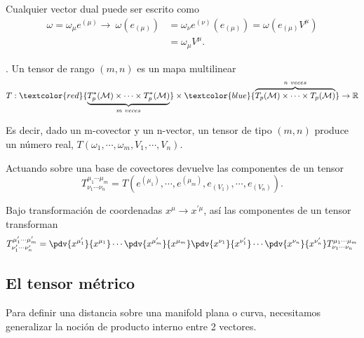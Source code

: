 \documentclass[../main]{subfiles}
\begin{document}
\begin{adjustwidth}{0pt}{-100pt}
Cualquier vector dual puede ser escrito como 
\begin{equation}
    \begin{split}
        \omega=\omega_{\mu}e^{(\mu)} \rightarrow \ \omega(e_{(\mu)})&=\omega_{\nu}e^{(\nu)}(e_{(\mu)})=\omega(e_{(\mu)}V^{\mu})\\
        &=\omega_{\mu}V^{\mu}.
    \end{split}
\end{equation}

. Un tensor de rango $(m, n)$ es un mapa multilinear
\begin{equation}
    T: \textcolor{red}{\underbrace{T^*_p(\mathcal{M})\times \cdots \times T^*_p(\mathcal{M})}_{m \ veces}} \times \textcolor{blue}{\overbrace{T_p(\mathcal{M})\times \cdots \times T_p(\mathcal{M})}^{n \ veces}} \rightarrow \mathbb{R}
\end{equation}

Es decir, dado un m-covector y un n-vector, un tensor de tipo $(m, n)$ produce un número real, $T(\omega_1, \cdots, \omega_m, V_1, \cdots, V_n)$.

Actuando sobre una base de covectores devuelve las componentes de un tensor
\begin{equation}
    T^{\mu_1 \cdots \mu_m}_{\nu_1 \cdots \nu_n}=T(e^{(\mu_1)}, \cdots, e^{(\mu_m)}, e_{(V_1)}, \cdots, e_{(V_n)}).
\end{equation}

Bajo transformación de coordenadas $x^{\mu} \rightarrow x^{'\mu}$, así las componentes de un tensor transforman 
\begin{equation}
    T^{\mu'_1 \cdots \mu'_m}_{\nu'_1 \cdots \nu'_n}=\pdv{x^{\mu'_1}}{x^{\mu_1}}\cdots \pdv{x^{\mu'_m}}{x^{\mu_m}}\pdv{x^{\nu_1}}{x^{\nu'_1}}\cdots \pdv{x^{\nu_n}}{x^{\nu'_n}}T^{\mu_1 \cdots \mu_m}_{\nu_1 \cdots \nu_n}
\end{equation}

\subsection{El tensor métrico}
Para definir una distancia sobre una manifold plana o curva, necesitamos generalizar la noción de producto interno entre 2 vectores.


\end{adjustwidth}
\end{document}
